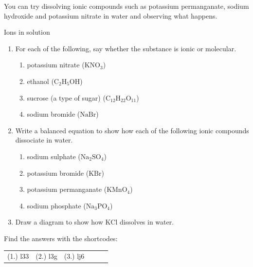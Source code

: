     \noindent
You can try dissolving ionic compounds such as potassium permanganate, sodium hydroxide and potassium nitrate in water and observing what happens. 
  \label{m38720*secfhsst!!!underscore!!!id338}
            \begin{exercises}{Ions in solution}
            \nopagebreak \noindent
            \label{m38720*id336094}\begin{enumerate}[noitemsep, label=\textbf{\arabic*}. ] 
            \label{m38720*uid22}\item For each of the following, say whether the substance is ionic or molecular.
\label{m38720*id336110}\begin{enumerate}[noitemsep, label=\textbf{\alph*}. ] 
            \label{m38720*uid23}\item potassium nitrate ($\text{KNO}_{3}$)
\label{m38720*uid24}\item ethanol ($\text{C}_{2}\text{H}_{5}\text{OH}$)
\label{m38720*uid25}\item sucrose (a type of sugar) ($\text{C}_{12}\text{H}_{22}\text{O}_{11}$)
\label{m38720*uid26}\item sodium bromide ($\text{NaBr}$)
\end{enumerate}
\label{m38720*uid27}\item Write a balanced equation to show how each of the following ionic compounds dissociate in water.
\label{m38720*id336252}\begin{enumerate}[noitemsep, label=\textbf{\alph*}. ] 
            \label{m38720*uid28}\item sodium sulphate ($\text{Na}_{2}\text{SO}_{4}$)
\label{m38720*uid29}\item potassium bromide ($\text{KBr}$)
\label{m38720*uid30}\item potassium permanganate ($\text{KMnO}_{4}$)
\label{m38720*uid31}\item sodium phosphate ($\text{Na}_{3}\text{PO}_{4}$)
\end{enumerate}
\item Draw a diagram to show how $\text{KCl}$ dissolves in water.
\end{enumerate}
\practiceinfo
\par {} Find the answers with the shortcodes:
 \par \begin{tabular}[h]{cccccc}
 (1.) l33  &  (2.) l3g  & (3.) lj6 \end{tabular}
\end{exercises}
